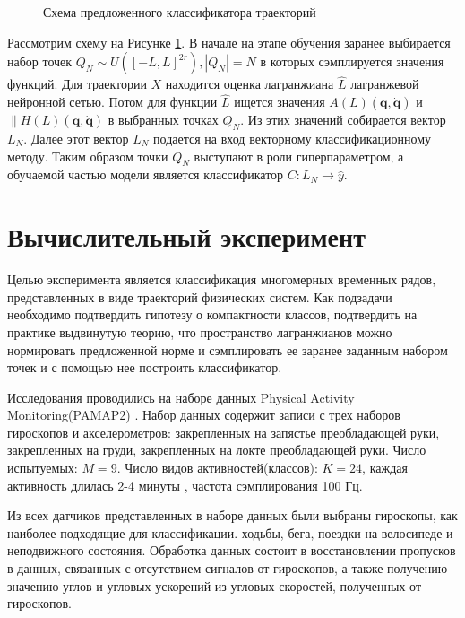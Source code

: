 \documentclass[a4paper, 12pt]{article}
\begin{document}
\begin{figure}[!htbp]
\centering
{}
\caption{Схема предложенного классификатора траекторий}
\label{fig: classificator}
\end{figure}

Рассмотрим схему на Рисунке \ref{fig: classificator}. В начале на этапе обучения заранее выбирается набор точек $Q_N \sim U([-L, L]^{2r}), |Q_N| = N$ в которых сэмплируется значения функций. Для траектории $X$ находится оценка лагранжиана $\hat{L}$ лагранжевой нейронной сетью. Потом для функции $\hat{L}$ ищется значения $A(L)\left(\mathbf{q}, \dot{\mathbf{q}}\right)$ и $\|H(L)\left(\mathbf{q}, \dot{\mathbf{q}}\right)$ в выбранных точках $Q_N$. Из этих значений собирается вектор $L_N$. Далее этот вектор $L_N$ подается на вход векторному классификационному методу. Таким образом точки  $Q_N$ выступают в роли гиперпараметром, а обучаемой частью модели является классификатор $C: L_N \to \hat{y}$.

\section{Вычислительный эксперимент}
 Целью эксперимента является классификация многомерных временных рядов, представленных в виде траекторий физических систем. Как подзадачи необходимо подтвердить гипотезу о компактности классов, подтвердить на практике выдвинутую теорию, что пространство лагранжианов можно нормировать предложенной норме и сэмплировать ее заранее заданным набором точек и с помощью нее построить классификатор.

    Исследования проводились на наборе данных Physical Activity Monitoring(PAMAP2) \cite{misc_pamap2_physical_activity_monitoring_231}.
 Набор данных содержит записи с трех наборов гироскопов и акселерометров: закрепленных на запястье преобладающей руки, закрепленных на груди, закрепленных на локте преобладающей руки. Число испытуемых: $M = 9$. Число видов активностей(классов): $K = 24$, каждая активность длилась 2-4 минуты \cite{misc_pamap2_physical_activity_monitoring_231}, частота сэмплирования 100 Гц.


 Из всех датчиков представленных в наборе данных были выбраны гироскопы, как наиболее подходящие для классификации. ходьбы, бега, поездки на велосипеде и неподвижного состояния. Обработка данных состоит в восстановлении пропусков в данных, связанных с отсутствием сигналов от гироскопов, а также получению значению углов и угловых ускорений из угловых скоростей, полученных от гироскопов.
 
\end{document}
